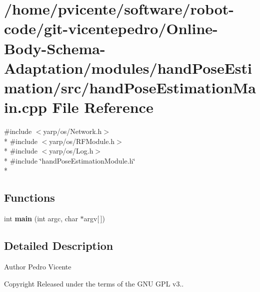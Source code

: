 \section{/home/pvicente/software/robot-\/code/git-\/vicentepedro/\+Online-\/\+Body-\/\+Schema-\/\+Adaptation/modules/hand\+Pose\+Estimation/src/hand\+Pose\+Estimation\+Main.cpp File Reference}
\label{handPoseEstimationMain_8cpp}
{\ttfamily \#include $<$yarp/os/\+Network.\+h$>$}\\*
{\ttfamily \#include $<$yarp/os/\+R\+F\+Module.\+h$>$}\\*
{\ttfamily \#include $<$yarp/os/\+Log.\+h$>$}\\*
{\ttfamily \#include \char`\"{}hand\+Pose\+Estimation\+Module.\+h\char`\"{}}\\*
\subsection*{Functions}
\begin{DoxyCompactItemize}
\item 
int {\bfseries main} (int argc, char $\ast$argv\mbox{[}$\,$\mbox{]})\label{handPoseEstimationMain_8cpp_a0ddf1224851353fc92bfbff6f499fa97}

\end{DoxyCompactItemize}


\subsection{Detailed Description}
\begin{DoxyAuthor}{Author}
Pedro Vicente 
\end{DoxyAuthor}
\begin{DoxyCopyright}{Copyright}
Released under the terms of the G\+NU G\+PL v3.. 
\end{DoxyCopyright}
